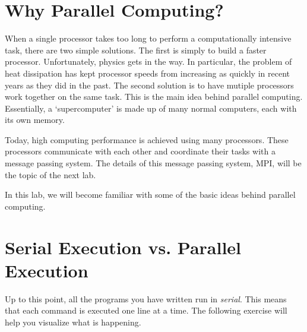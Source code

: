 \label{lab:parallel1}

\section*{Why Parallel Computing?}
When a single processor takes too long to perform a computationally intensive task, there are two simple solutions.
The first is simply to build a faster processor.
Unfortunately, physics gets in the way.
In particular, the problem of heat dissipation has kept processor speeds from increasing as quickly in recent years as they did in the past.
The second solution is to have mutiple processors work together on the same task.
This is the main idea behind parallel computing. Essentially, a `supercomputer' is made up of many normal computers, each with its own memory.

Today, high computing performance is achieved using many processors.
These processors communicate with each other and coordinate their tasks with a message passing system. The details of this message passing system, MPI, will be the topic of the next lab.

In this lab, we will become familiar with some of the basic ideas behind parallel computing.

\section*{Serial Execution vs. Parallel Execution}
Up to this point, all the programs you have written run in \emph{serial}. This means that each command is executed one line at a time. The following exercise will help you visualize what is happening.

